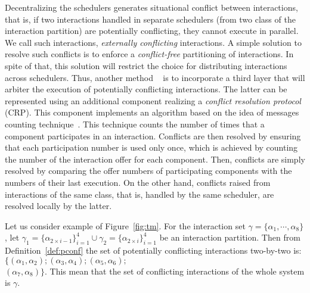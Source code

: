 Decentralizing the schedulers generates situational conflict between interactions, that is, 
if two interactions handled in separate schedulers (from two class of the interaction partition)
are potentially conflicting, they cannot execute in parallel. We call such interactions,
\emph{externally conflicting} interactions. 
A simple solution to resolve such conflicts is to enforce
a \emph{conflict-free} partitioning of interactions. In spite of that, this solution will 
restrict the choice for distributing interactions across schedulers. Thus, another method
~\cite{jean,ahlem_these} is to incorporate a third layer that will arbiter the execution of 
potentially 
conflicting interactions. The latter can be represented using an additional component realizing 
a \emph{conflict resolution protocol} (CRP). This component implements an algorithm based on 
the idea of messages counting technique~\cite{msg_cnt}.
This technique counts the number of times that a component participates in an 
interaction. Conflicts are then resolved by ensuring that each participation number is used 
only once, which is achieved by counting the number of the interaction offer for each 
component. Then, conflicts are simply resolved by comparing the offer numbers of participating
components with the numbers of their last execution.
On the other hand, conflicts raised from interactions of the same class, that is, handled by 
the same scheduler, are resolved locally by the latter.
\begin{example}\label{exp:partition}
  Let us consider example of Figure~\ref{fig:tm}. For the interaction set $\gamma=\{\alpha_1,
  \cdots,\alpha_8\}$, let $\gamma_1=\{\alpha_{2\times i-1}\}_{i=1}^4\cup\gamma_2=
  \{\alpha_{2\times i}\}_{i=1}^4$ be an interaction partition. Then from 
  Definition~\ref{def:pconf} the set of potentially conflicting interactions two-by-two is:
  $\{(\alpha_1,\alpha_2);(\alpha_3,\alpha_4);(\alpha_5,\alpha_6);$\\$(\alpha_7,\alpha_8)\}$.
  This mean that the set of conflicting interactions of the whole system is $\gamma$.
\end{example}

